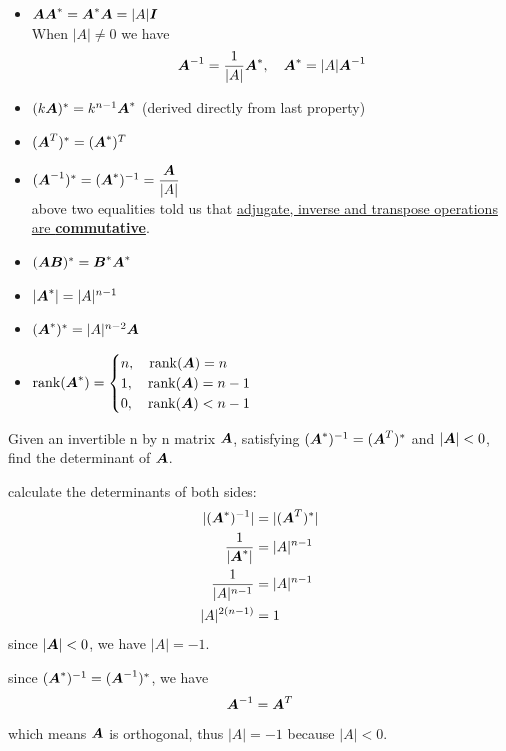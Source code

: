 \documentclass{overview}
\begin{document}
\begin{itemize}
	\item $\boldsymbol{A}\boldsymbol{A}^{*} = \boldsymbol{A}^{*}\boldsymbol{A} =
		|A|\boldsymbol{I}$ \\
		When $|A| \ne 0$ we have
		\[
			\boldsymbol{A}^{-1} = \frac{1}{|A|}\boldsymbol{A}^{*}
			,\quad
			\boldsymbol{A}^{*} = |A|\boldsymbol{A}^{-1}
		\] 
	\item $(k\boldsymbol{A})^{*} = k^{n-1}\boldsymbol{A}^{*}$
		\quad (derived directly from last property)
	\item $(\boldsymbol{A}^T)^{*} = (\boldsymbol{A}^{*})^T$
	\item $(\boldsymbol{A}^{-1})^{*}=(\boldsymbol{A}^{*})^{-1}=\dfrac{ \boldsymbol{A}}{|A|}$ \\
		above two equalities told us that \underline{adjugate, inverse and transpose
		operations are \textbf{commutative}}.
	\item $(\boldsymbol{A}\boldsymbol{B})^{*} = \boldsymbol{B}^{*}\boldsymbol{A}^{*}$
	\item $|\boldsymbol{A}^{*}| = |A|^{n-1}$
	\item $(\boldsymbol{A}^{*})^{*} = |A|^{n-2}\boldsymbol{A}$
	\item $\operatorname{rank}(\boldsymbol{A}^{*})=
		\begin{cases}
			n,\quad \operatorname{rank}(\boldsymbol{A})=n \\
			1,\quad \operatorname{rank}(\boldsymbol{A})=n-1 \\
			0,\quad \operatorname{rank}(\boldsymbol{A})<n-1 \\
		\end{cases}$

		
\end{itemize}

\begin{example}
	Given an invertible n by n matrix $\boldsymbol{A}$, satisfying $(\boldsymbol{A}^{*})^{-1}=(\boldsymbol{A}^{T})^{*}$ and
	$|\boldsymbol{A}|<0$, find the determinant of $\boldsymbol{A}$.
	\begin{answer}[Method 1]
		calculate the determinants of both sides:
		\[
			\begin{aligned}
				|(\boldsymbol{A}^{*})^{-1}| &= |(\boldsymbol{A}^{T})^{*}| \\
				\frac{1}{|\boldsymbol{A}^{*}|} &= |A|^{n-1} \\
				\frac{1}{|A|^{n-1}} &= |A|^{n-1} \\
				|A|^{2(n-1)} &= 1 \\
			\end{aligned}
		\]
		since $|\boldsymbol{A}|<0$, we have $|A|=-1$.
	\end{answer}
	\begin{answer}[Method 2]
		since $(\boldsymbol{A}^{*})^{-1}=(\boldsymbol{A}^{-1})^{*}$, we have
		\[
			\boldsymbol{A}^{-1} = \boldsymbol{A}^{T}
		\] 
		which means $\boldsymbol{A}$ is orthogonal, thus $|A|=-1$ because $|A|<0$.
	\end{answer}
\end{example}
\end{document}
